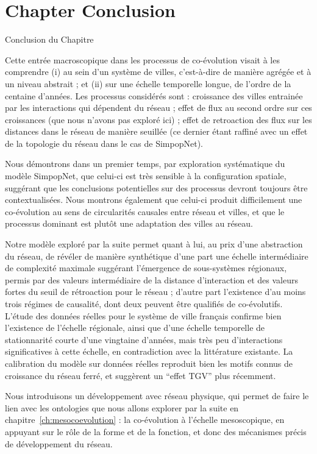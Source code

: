 

\newpage


\section*{Chapter Conclusion}{Conclusion du Chapitre}


Cette entrée macroscopique dans les processus de co-évolution visait à les comprendre (i) au sein d'un système de villes, c'est-à-dire de manière agrégée et à un niveau abstrait ; et (ii) sur une échelle temporelle longue, de l'ordre de la centaine d'années. Les processus considérés sont : croissance des villes entrainée par les interactions qui dépendent du réseau ; effet de flux au second ordre sur ces croissances (que nous n'avons pas exploré ici) ; effet de retroaction des flux sur les distances dans le réseau de manière seuillée (ce dernier étant raffiné avec un effet de la topologie du réseau dans le cas de SimpopNet).


Nous démontrons dans un premier temps, par exploration systématique du modèle SimpopNet, que celui-ci est très sensible à la configuration spatiale, suggérant que les conclusions potentielles sur des processus devront toujours être contextualisées. Nous montrons également que celui-ci produit difficilement une co-évolution au sens de circularités causales entre réseau et villes, et que le processus dominant est plutôt une adaptation des villes au réseau.


Notre modèle exploré par la suite permet quant à lui, au prix d'une abstraction du réseau, de révéler de manière synthétique d'une part une échelle intermédiaire de complexité maximale suggérant l'émergence de sous-systèmes régionaux, permis par des valeurs intermédiaire de la distance d'interaction et des valeurs fortes du seuil de rétroaction pour le réseau ; d'autre part l'existence d'au moins trois régimes de causalité, dont deux peuvent être qualifiés de co-évolutifs. L'étude des données réelles pour le système de ville français confirme bien l'existence de l'échelle régionale, ainsi que d'une échelle temporelle de stationnarité courte d'une vingtaine d'années, mais très peu d'interactions significatives à cette échelle, en contradiction avec la littérature existante. La calibration du modèle sur données réelles reproduit bien les motifs connus de croissance du réseau ferré, et suggèrent un ``effet TGV'' plus récemment.


Nous introduisons un développement avec réseau physique, qui permet de faire le lien avec les ontologies que nous allons explorer par la suite en chapitre~\ref{ch:mesocoevolution} : la co-évolution à l'échelle mesoscopique, en appuyant sur le rôle de la forme et de la fonction, et donc des mécanismes précis de développement du réseau.



\stars
